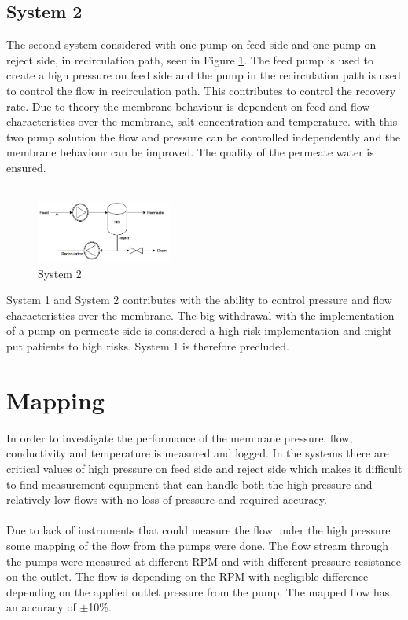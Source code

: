 \subsection{System 2}
The second system considered with one pump on feed side and one pump on reject side, in recirculation path, seen in Figure \ref{fig:Sys2}. The feed pump is used to create a high pressure on feed side and the pump in the recirculation path is used to control the flow in recirculation path. This contributes to control the recovery rate. Due to theory the membrane behaviour is dependent on feed and flow characteristics over the membrane, salt concentration and temperature. with this two pump solution the flow and pressure can be controlled independently and the membrane behaviour can be improved. The quality of the permeate water is ensured. \\
\\
\begin{figure}[h]
    \centering
    \includegraphics[width=0.4\textwidth]{Sys2}
    \caption{System 2}
    \label{fig:Sys2}
\end{figure}
System 1 and System 2 contributes with the ability to control pressure and flow characteristics over the membrane. The big withdrawal with the implementation of a pump on permeate side is considered a high risk implementation and might put patients to high risks. System 1 is therefore precluded.

\section{Mapping}
In order to investigate the performance of the membrane pressure, flow, conductivity and temperature is  measured and logged. In the systems there are critical values of high pressure on feed side and reject side which makes it difficult to find measurement equipment that can handle both the high pressure and relatively low flows with no loss of pressure and required accuracy. \\
\\
Due to lack of instruments that could measure the flow under the high pressure some mapping of the flow from the pumps were done. The flow stream through the pumps were measured at different RPM and with different pressure resistance on the outlet. The flow is depending on the RPM with negligible difference depending on the applied outlet pressure from the pump. The mapped flow has an accuracy of $\pm$10\%.

